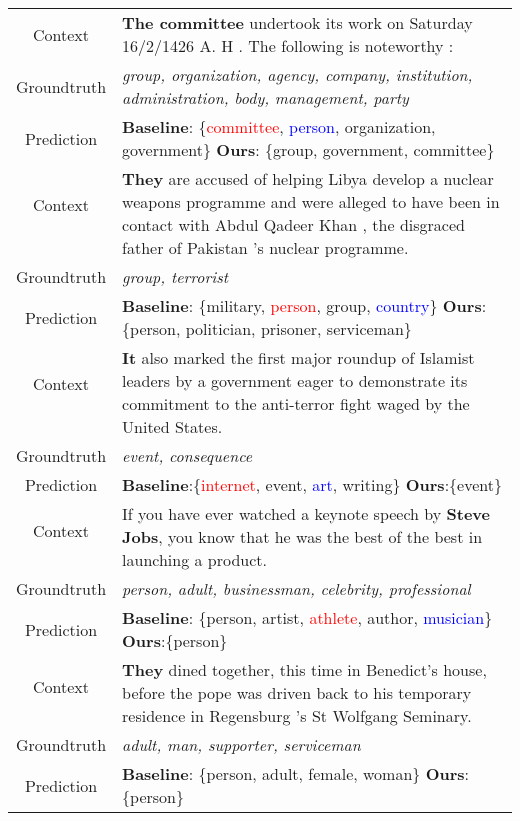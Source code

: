 \documentclass[11pt,a4paper]{article}
\begin{document}
\begin{table*}[t]
\begin{tabular}{c|l}
        Context & \textbf{The committee} undertook its work on Saturday 16/2/1426 A. H . The following is noteworthy : \\
        Groundtruth & \textit{group, organization, agency, company, institution, administration, body, management, party}\\
        Prediction & \textbf{Baseline}: \{\textcolor{red}{committee}, \textcolor{blue}{person}, organization, government\} \textbf{Ours}: \{group, government, committee\}
        
        \\ \midrule
        Context & \multirow{2}{13cm}{\textbf{They} are accused of helping Libya develop a nuclear weapons programme and were alleged to have been in contact with Abdul Qadeer Khan , the disgraced father of Pakistan 's nuclear programme.} \\
        & \\
        Groundtruth & \textit{group, terrorist} \\
        Prediction & \textbf{Baseline}: \{military, \textcolor{red}{person}, group, \textcolor{blue}{country}\} \textbf{Ours}: \{person, politician, prisoner, serviceman\}
        
        \\ \midrule
        Context & \multirow{2}{13cm}{\textbf{It} also marked the first major roundup of Islamist leaders by a government eager to demonstrate its commitment to the anti-terror fight waged by the United States.}\\
        & \\
        Groundtruth & \textit{event, consequence} \\ 
        Prediction & \textbf{Baseline}:\{\textcolor{red}{internet}, event, \textcolor{blue}{art}, writing\} \textbf{Ours}:\{event\} \\  \midrule
        
        Context & \multirow{2}{13cm}{If you have ever watched a keynote speech by \textbf{Steve Jobs}, you know that he was the best of the best in launching a product.} \\
        & \\
        Groundtruth & \textit{person, adult, businessman, celebrity, professional} \\
        Prediction & \textbf{Baseline}: \{person, artist, \textcolor{red}{athlete}, author, \textcolor{blue}{musician}\} \textbf{Ours}:\{person\} \\ \midrule
        
        Context & \multirow{2}{13cm}{\textbf{They} dined together,  this time in Benedict's house, before the pope was driven back to his temporary residence in Regensburg 's St Wolfgang Seminary.} \\
        & \\
        Groundtruth & \textit{adult, man, supporter, serviceman}\\
        Prediction & \textbf{Baseline}: \{person, adult, female, woman\} \textbf{Ours}: \{person\} \\ \midrule


\end{tabular}
\end{table*}
\end{document}
